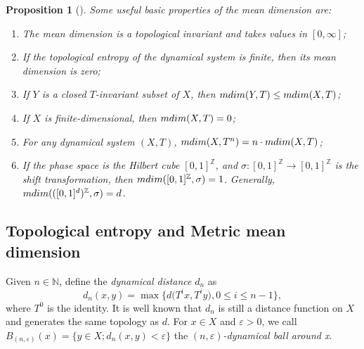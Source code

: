 \documentclass[sn-mathphys-num]{sn-jnl}%
\theoremstyle{thmstyleone}%
\newtheorem{proposition}{Proposition}%
\theoremstyle{thmstyletwo}%
\theoremstyle{thmstylethree}%
\begin{document}
\begin{proposition}[\cite{lindenstrauss_weiss_2000, coornaert_2015}]
    Some useful basic properties of the mean dimension are:
\begin{enumerate}
    \item[1.] The mean dimension is a topological invariant and takes values in $[0, \infty]$;
    \item[2.] If the topological entropy of the dynamical system is finite, then its mean dimension is zero;
    \item[3.] If $Y$ is a closed $T$-invariant subset of $X$, then $\emph{mdim}(Y, T) \leq \emph{mdim}(X, T)$;
    \item[4.] If $X$ is finite-dimensional, then $\emph{mdim}(X, T) = 0$;
    \item[5.] For any dynamical system $(X, T)$,  $\emph{mdim}(X, T^n) = n\cdot\emph{mdim}(X, T)$;
    \item[6.] If the phase space is the Hilbert cube $[0, 1]^\mathbb{Z}$, and $\sigma: [0, 1]^\mathbb{Z} \to [0, 1]^\mathbb{Z}$ is the shift transformation, then $\emph{mdim}([0, 1]^\mathbb{Z}, \sigma) = 1$. Generally, $\emph{mdim}(([0, 1]^d)^\mathbb{Z}, \sigma) = d$.
\end{enumerate}
\end{proposition}




\subsection{Topological entropy and Metric mean dimension}

Given $n \in \mathbb{N}$, define the \emph{dynamical distance} $d_n$ as 
\[
d_n(x, y) = \max \{d\big(T^ix, T^iy\big), 0 \leq i \leq n - 1\},
\]
where $T^0$ is the identity. It is well known that $d_n$ is still a distance function on $X$ and generates the same topology as $d$. For $x \in X$ and $\varepsilon > 0$, we call $B_{(n, \varepsilon)}(x) = \{y \in X; d_n(x, y) < \varepsilon\}$ the \textit{$(n, \varepsilon)$-dynamical ball around x}.
\end{document}
